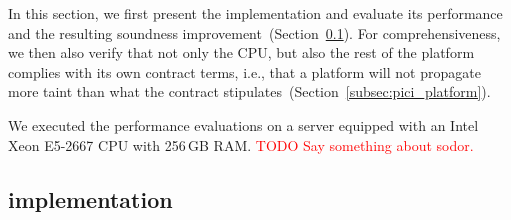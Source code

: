 In this section, we first present the \PICI implementation and evaluate its performance and the resulting soundness improvement~(Section~\ref{subsec:pici_impl}).
For comprehensiveness, we then also  verify that not only the CPU, but also the rest of the platform complies with its own contract terms, i.e., that a platform will not propagate more taint than what the contract stipulates~(Section~\ref{subsec:pici_platform}).

We executed the performance evaluations on a server equipped with an Intel Xeon E5-2667 CPU with 256\,GB RAM.
\textcolor{red}{TODO Say something about sodor.}



\subsection{\PICI implementation}
\label{subsec:pici_impl}

